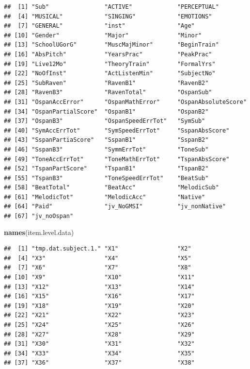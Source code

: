 \documentclass[]{book}
\newenvironment{Shaded}{\begin{snugshade}}{\end{snugshade}}
\newcommand{\KeywordTok}[1]{\textcolor[rgb]{0.13,0.29,0.53}{\textbf{#1}}}
\newcommand{\NormalTok}[1]{#1}
\theoremstyle{definition}
\theoremstyle{definition}
\theoremstyle{definition}
\theoremstyle{remark}
\begin{document}
\begin{verbatim}
##  [1] "Sub"                "ACTIVE"             "PERCEPTUAL"        
##  [4] "MUSICAL"            "SINGING"            "EMOTIONS"          
##  [7] "GENERAL"            "inst"               "Age"               
## [10] "Gender"             "Major"              "Minor"             
## [13] "SchoolUGorG"        "MuscMajMinor"       "BeginTrain"        
## [16] "AbsPitch"           "YearsPrac"          "PeakPrac"          
## [19] "Live12Mo"           "TheoryTrain"        "FormalYrs"         
## [22] "NoOfInst"           "ActListenMin"       "SubjectNo"         
## [25] "SubRaven"           "RavenB1"            "RavenB2"           
## [28] "RavenB3"            "RavenTotal"         "OspanSub"          
## [31] "OspanAccError"      "OspanMathError"     "OspanAbsoluteScore"
## [34] "OspanPartialScore"  "OspanB1"            "OspanB2"           
## [37] "OspanB3"            "OspanSpeedErrTot"   "SymSub"            
## [40] "SymAccErrTot"       "SymSpeedErrTot"     "SspanAbsScore"     
## [43] "SspanPartiaScore"   "SspanB1"            "SspanB2"           
## [46] "SspanB3"            "SymmErrTot"         "ToneSub"           
## [49] "ToneAccErrTot"      "ToneMathErrTot"     "TspanAbsScore"     
## [52] "TspanPartScore"     "TspanB1"            "TspanB2"           
## [55] "TspanB3"            "ToneSpeedErrTot"    "BeatSub"           
## [58] "BeatTotal"          "BeatAcc"            "MelodicSub"        
## [61] "MelodicTot"         "MelodicAcc"         "Native"            
## [64] "Paid"               "jv_NoGMSI"          "jv_nonNative"      
## [67] "jv_noOspan"
\end{verbatim}

\begin{Shaded}
\begin{Highlighting}[]
\KeywordTok{names}\NormalTok{(item.level.data)}
\end{Highlighting}
\end{Shaded}

\begin{verbatim}
##  [1] "tmp.dat.subject.1." "X1"                 "X2"                
##  [4] "X3"                 "X4"                 "X5"                
##  [7] "X6"                 "X7"                 "X8"                
## [10] "X9"                 "X10"                "X11"               
## [13] "X12"                "X13"                "X14"               
## [16] "X15"                "X16"                "X17"               
## [19] "X18"                "X19"                "X20"               
## [22] "X21"                "X22"                "X23"               
## [25] "X24"                "X25"                "X26"               
## [28] "X27"                "X28"                "X29"               
## [31] "X30"                "X31"                "X32"               
## [34] "X33"                "X34"                "X35"               
## [37] "X36"                "X37"                "X38"
\end{verbatim}
\end{document}
